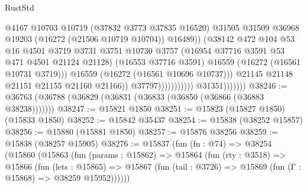 \begin{lexlean}{RustStd}
\begin{coremodule}
                                                  @4167
                                                  @10703
                                                  @10719
                                                  (@37832 @3773 @37835 @16520)
                                                  @31505
                                                  @31509
                                                  @36968
                                                  @19203
                                                  (@16272 (@21506 @10719 @10704))
                                                  @16489))
                                              (@38142
                                                @472
                                                @104
                                                @53
                                                @16
                                                @4501
                                                @3719
                                                @3731
                                                @3751
                                                @10730
                                                @3757
                                                (@16954 @37716 @3591 @53 @471 @4501 @21124 @21128)
                                                (@16553 @37716 @3591)
                                                @16559
                                                (@16272 (@16561 @10731 @3719)))
                                              @16559
                                              (@16272 (@16561 @10696 @10737)))
                                            @21145
                                            @21148
                                            @21151
                                            @21155
                                            @21160
                                            @21166))
                                        @37797)))))))))))
                  @31351)))))))
@38246 := @36763 (@36788 (@36829 (@36831 (@36833 (@36850 (@36866 (@36883 @38238)))))))
@38247 := @15821 @1850
@38251 := @15823 (@15827 @1850) (@15833 @1850)
@38252 := @15842 @35437
@38254 := @15838 (@38252 @15857)
@38256 := @15880 (@15881 @1850)
@38257 := @15876 @38256
@38259 := @15838 (@38257 @15905)
@38276 := @15837
    (fun (fn : @74) =>
    @38254
      (@15860
        (@15863
          (fun (params : @15862) =>
          @15864
            (fun (rty : @3518) =>
            @15866
              (fun (lets : @15865) =>
              @15867 (fun (tail : @3726) => @15869 (fun (Γ : @15868) => @38259 @15952))))))

\end{coremodule}
\end{lexlean}
